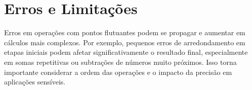 \newpage


\section{Erros e Limitações}

Erros em operações com pontos flutuantes podem se propagar e aumentar em cálculos mais complexos. Por exemplo, pequenos erros de arredondamento em etapas iniciais podem afetar significativamente o resultado final, especialmente em somas repetitivas ou subtrações de números muito próximos. Isso torna importante considerar a ordem das operações e o impacto da precisão em aplicações sensíveis.

